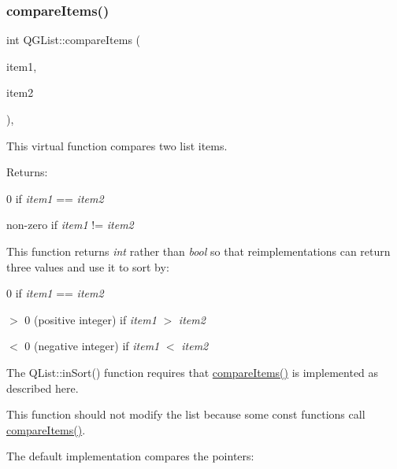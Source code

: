 \mbox{\label{class_q_g_list_a9a9c5fa3888371979c12e3207b3f9ec5}} 
\subsubsection{\texorpdfstring{compareItems()}{compareItems()}}
{\footnotesize\ttfamily int Q\+G\+List\+::compare\+Items (\begin{DoxyParamCaption}\item[{Q\+Collection\+::\+Item}]{item1,  }\item[{Q\+Collection\+::\+Item}]{item2 }\end{DoxyParamCaption})\hspace{0.3cm}{\ttfamily [protected]}, {\ttfamily [virtual]}}

This virtual function compares two list items.

Returns\+: 
\begin{DoxyItemize}
\item 0 if {\itshape item1} == {\itshape item2} 
\item non-\/zero if {\itshape item1} != {\itshape item2} 
\end{DoxyItemize}

This function returns {\itshape int} rather than {\itshape bool} so that reimplementations can return three values and use it to sort by\+:


\begin{DoxyItemize}
\item 0 if {\itshape item1} == {\itshape item2} 
\item $>$ 0 (positive integer) if {\itshape item1} $>$ {\itshape item2} 
\item $<$ 0 (negative integer) if {\itshape item1} $<$ {\itshape item2} 
\end{DoxyItemize}

The Q\+List\+::in\+Sort() function requires that \mbox{\hyperlink{class_q_g_list_a9a9c5fa3888371979c12e3207b3f9ec5}{compare\+Items()}} is implemented as described here.

This function should not modify the list because some const functions call \mbox{\hyperlink{class_q_g_list_a9a9c5fa3888371979c12e3207b3f9ec5}{compare\+Items()}}.

The default implementation compares the pointers\+: 
\begin{DoxyCode}{0}
\end{DoxyCode}
 

